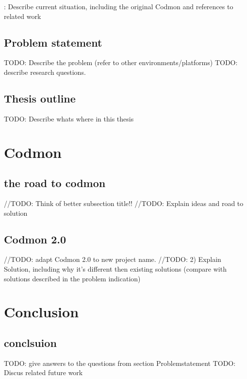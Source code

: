 \documentclass[a4paper,10pt]{scrartcl}
\begin{document}
\TODO: Describe current situation, including the original Codmon and references to related work

\subsection{Problem statement}
\label{subsec:Problemstatement}
TODO: Describe the problem (refer to other environments/platforms)
TODO: describe research questions.

\subsection{Thesis outline}
\label{subsec:Thesisoutline}
TODO: Describe whats where in this thesis

\newpage

\section{Codmon}
\label{sec:codmon}

\subsection{the road to codmon}
//TODO: Think of better subsection title!!
//TODO: Explain ideas and road to solution

\subsection{Codmon 2.0}
//TODO: adapt Codmon 2.0 to new project name.
//TODO: 2) Explain Solution, including why it's different then existing solutions (compare with solutions described in the problem indication)

\newpage
\section{Conclusion}
\subsection{conclsuion}
TODO: give answers to the questions from section Problemstatement
TODO: Discus related future work
\newpage


\end{document}
